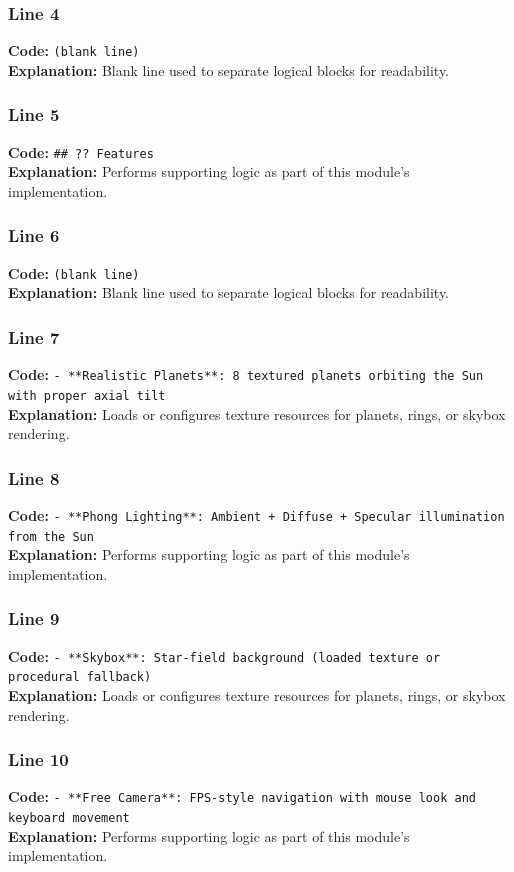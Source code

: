 \documentclass[11pt,a4paper]{article}
\begin{document}
\subsubsection*{Line 4}
\textbf{Code:} \texttt{(blank line)}\\
\textbf{Explanation:} Blank line used to separate logical blocks for readability.

\subsubsection*{Line 5}
\textbf{Code:} \verb|## ?? Features|\\
\textbf{Explanation:} Performs supporting logic as part of this module's implementation.

\subsubsection*{Line 6}
\textbf{Code:} \texttt{(blank line)}\\
\textbf{Explanation:} Blank line used to separate logical blocks for readability.

\subsubsection*{Line 7}
\textbf{Code:} \verb|- **Realistic Planets**: 8 textured planets orbiting the Sun with proper axial tilt|\\
\textbf{Explanation:} Loads or configures texture resources for planets, rings, or skybox rendering.

\subsubsection*{Line 8}
\textbf{Code:} \verb|- **Phong Lighting**: Ambient + Diffuse + Specular illumination from the Sun|\\
\textbf{Explanation:} Performs supporting logic as part of this module's implementation.

\subsubsection*{Line 9}
\textbf{Code:} \verb|- **Skybox**: Star-field background (loaded texture or procedural fallback)|\\
\textbf{Explanation:} Loads or configures texture resources for planets, rings, or skybox rendering.

\subsubsection*{Line 10}
\textbf{Code:} \verb|- **Free Camera**: FPS-style navigation with mouse look and keyboard movement|\\
\textbf{Explanation:} Performs supporting logic as part of this module's implementation.
\end{document}
